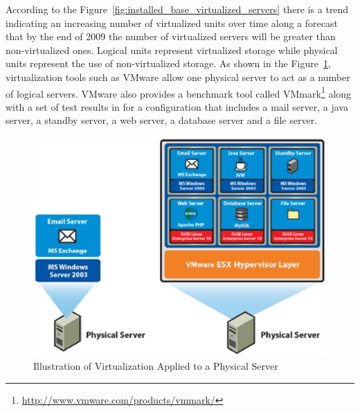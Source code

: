{                According to the Figure~\ref{fig:installed_base_virtualized_servers} there is a trend indicating an increasing number of virtualized units over time along a forecast that by the end of 2009 the number of virtualized servers will be greater than non-virtualized ones. Logical units represent virtualized storage while physical units represent the use of non-virtualized storage. As shown in the Figure~\ref{fig:illustration_virtualization_to_physical_server}, virtualization tools such as VMware allow one physical server to act as a number of logical servers. VMware also provides a benchmark tool called VMmark\footnote{\url{http://www.vmware.com/products/vmmark/}} along with a set of test results in \cite{Makhija06} for a configuration that includes a mail server, a java server, a standby server, a web server, a database server and a file server.
                \begin{figure}[h!tb]
                    \centering
                    \includegraphics[scale=0.7]{graphics/illustration_virtualization_to_physical_server}
                    \caption{Illustration of Virtualization Applied to a Physical Server}
                    \label{fig:illustration_virtualization_to_physical_server}
                \end{figure}
                
}
